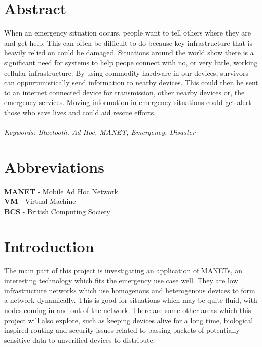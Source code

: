 \documentclass{report}
\begin{document}
\chapter*{Abstract}

When an emergency situation occurs, people want to tell others where they are and get help. 
This can often be difficult to do because key infrastructure that is heavily relied on could be damaged.
Situations around the world show there is a significant need for systems to help peope connect with no, or very little, working cellular infrastructure. 
By using commodity hardware in our devices, survivors can oppurtunistically send information to nearby devices. 
This could then be sent to an internet connected device for transmission, other nearby devices or, the emergency services. 
Moving information in emergency situations could get alert those who save lives and could aid rescue efforts.
\\
\\
\textit{Keywords: Bluetooth, Ad Hoc, MANET, Emergency, Disaster}



\chapter*{Abbreviations}

\textbf{MANET} - Mobile Ad Hoc Network\\
\textbf{VM} - Virtual Machine\\
\textbf{BCS} - British Computing Society\\




\chapter*{Introduction}

The main part of this project is investigating an application of MANETs, an interesting technology which fits the 
emergency use case well. They are low infrastructure networks which use homogenous and heterogenous devices to form a 
network dynamically. This is good for situations which may be quite fluid, with nodes coming in and out of the network\cite{sun2001mobile}. 
There are some other areas which this project will also explore, such as keeping devices alive for a long time, biological 
inspired routing and security issues related to passing packets of potentially sensitive data to unverified devices to distribute.
\end{document}
